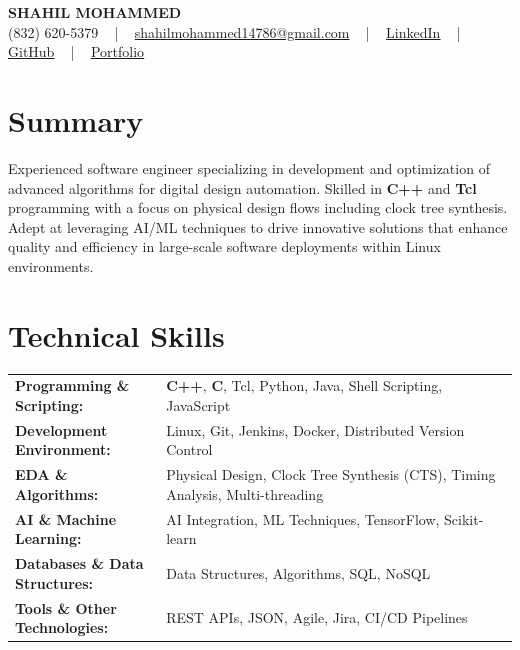 \documentclass[letterpaper,11pt]{article}
\begin{document}
\begin{center}
    {\fontsize{14pt}{12pt}\selectfont \textbf{\MakeUppercase{Shahil Mohammed}}}\\ \vspace{2pt}
    \fontsize{10pt}{12pt}\selectfont (832) 620-5379 ~ | ~ \href{mailto:shahilmohammed14786@gmail.com}{shahilmohammed14786@gmail.com} ~ | ~  
    \href{https://www.linkedin.com/in/shahil-mohammed-9652931a1/}{\color{blue}\underline{LinkedIn}}  ~ | ~ 
    \href{https://github.com/freakbeast14}{\color{blue}\underline{GitHub}} ~ | ~ 
    \href{https://shahil-mohammed.netlify.app/}{\color{blue}\underline{Portfolio}}
    \vspace{-8pt}
\end{center}

\section{Summary}
\fontsize{9pt}{10pt}\selectfont
Experienced software engineer specializing in development and optimization of advanced algorithms for digital design automation. Skilled in \textbf{C++} and \textbf{Tcl} programming with a focus on physical design flows including clock tree synthesis. Adept at leveraging AI/ML techniques to drive innovative solutions that enhance quality and efficiency in large-scale software deployments within Linux environments.
 \vspace{-5pt}
 
\section{Technical Skills}
        \vspace{-14pt}
        \begin{table}[h]
            \fontsize{9pt}{10pt}\selectfont
            \begin{tabular}{p{0.3\linewidth} p{0.7\linewidth}}
                \textbf{Programming \& Scripting:} & \textbf{C++}, \textbf{C}, Tcl, Python, Java, Shell Scripting, JavaScript \\
                \textbf{Development Environment:} & Linux, Git, Jenkins, Docker, Distributed Version Control \\
                \textbf{EDA \& Algorithms:} & Physical Design, Clock Tree Synthesis (CTS), Timing Analysis, Multi-threading \\
                \textbf{AI \& Machine Learning:} & AI Integration, ML Techniques, TensorFlow, Scikit-learn \\
                \textbf{Databases \& Data Structures:} & Data Structures, Algorithms, SQL, NoSQL \\
                \textbf{Tools \& Other Technologies:} & REST APIs, JSON, Agile, Jira, CI/CD Pipelines \\
            \end{tabular}
        \end{table}
 \vspace{-15pt}
 
\end{document}
